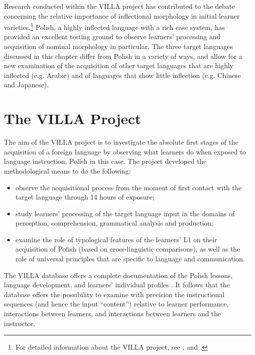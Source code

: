 \documentclass[output=paper,colorlinks,citecolor=brown,modfonts,nonflat]{../langscibook}
\begin{document}
Research conducted within the VILLA project has contributed to the debate concerning the relative importance of inflectional morphology in initial learner varieties.\footnote{{For detailed information about the VILLA project, see \citealt{DimrothEtAl2013, Rast2017}, and \citealt{Saturno2017}.}} Polish, a highly inflected language with a rich case system, has provided an excellent testing ground to observe learners’ processing and acquisition of nominal morphology in particular. The three target languages discussed in this chapter differ from Polish in a variety of ways, and allow for a new examination of the acquisition of other target languages that are highly inflected (e.g. Arabic) and of languages that show little inflection (e.g. Chinese and Japanese).

\section{The VILLA Project}\label{sec:watorek:3}

The aim of the VILLA project is to investigate the absolute first stages of the acquisition of a foreign language by observing what learners do when exposed to language instruction, Polish in this case. The project developed the methodological means to do the following:

\begin{itemize}
    \item observe the acquisitional process from the moment of first contact with the target language through 14 hours of exposure;
    \item study learners’ processing of the target language input in the domains of perception, comprehension, grammatical analysis and production;
    \item examine the role of typological features of the learners’ L1 on their acquisition of Polish (based on cross-linguistic comparisons), as well as the role of universal principles that are specific to language and communication.
\end{itemize}

The VILLA database offers a complete documentation of the Polish lessons, language development, and learners’ individual profiles \citep{Durand2019}. It follows that the database offers the possibility to examine with precision the instructional sequences (and hence the input “content”) relative to learner performance, interactions between learners, and interactions between learners and the instructor.
\end{document}
